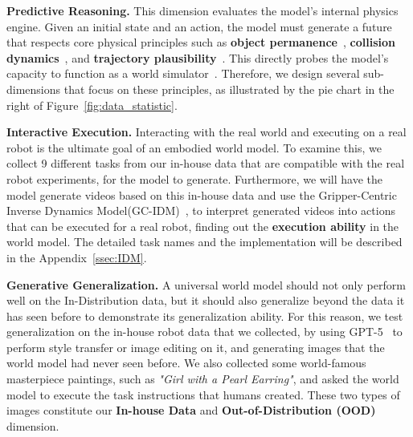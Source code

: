 \textbf{Predictive Reasoning.}
This dimension evaluates the model's internal physics engine. Given an initial state and an action, the model must generate a future that respects core physical principles such as \textbf{object permanence}~\cite{bansal2024videophy, chow2025physbench}, \textbf{collision dynamics}~\cite{meng2024towards, chow2025physbench, bansal2024videophy, motamed2025generative}, and \textbf{trajectory plausibility}~\cite{qin2024worldsimbenchvideogenerationmodels, li2025worldmodelbench, duan2025worldscoreunifiedevaluationbenchmark, zheng2025vbench, yue2025ewmbench}. This directly probes the model's capacity to function as a world simulator~\cite{sora2024}. Therefore, we design several sub-dimensions that focus on these principles, as illustrated by the pie chart in the right of Figure~\ref{fig:data_statistic}. 


\textbf{Interactive Execution.} Interacting with the real world and executing on a real robot is the ultimate goal of an embodied world model. To examine this, we collect 9 different tasks from our in-house data that are compatible with the real robot experiments, for the model to generate. Furthermore, we will have the model generate videos based on this in-house data and use the Gripper-Centric Inverse Dynamics Model(GC-IDM)~\cite{chi2025wow}, to interpret generated videos into actions that can be executed for a real robot, finding out the \textbf{execution ability} in the world model. The detailed task names and the implementation will be described in the Appendix~\ref{ssec:IDM}.

\textbf{Generative Generalization.}
A universal world model should not only perform well on the In-Distribution data, but it should also generalize beyond the data it has seen before to demonstrate its generalization ability. For this reason, we test generalization on the in-house robot data that we collected, by using GPT-5~\cite{hurst2024gpt} to perform style transfer or image editing on it, and generating images that the world model had never seen before. We also collected some world-famous masterpiece paintings, such as \textit{"Girl with a Pearl Earring"}, and asked the world model to execute the task instructions that humans created. These two types of images constitute our \textbf{In-house Data} and \textbf{Out-of-Distribution (OOD)} dimension. 

